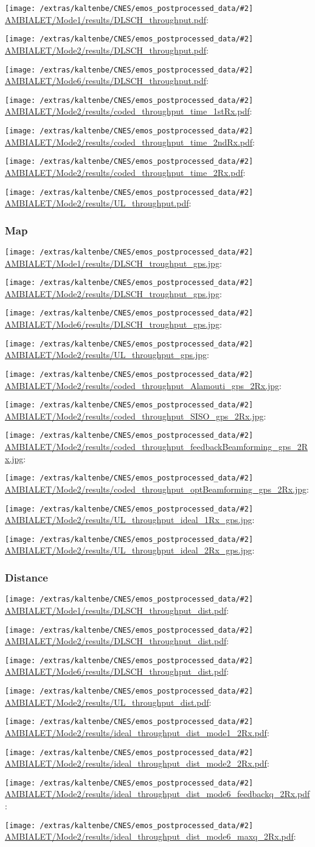 \documentclass[a4paper,10pt]{article}
\newcommand{\printfile}[2][]{
 \begin{minipage}{8cm}
  \centering
  \texttt{[image: /extras/kaltenbe/CNES/emos\_postprocessed\_data/\#2]}
  \url{#2}: #1

 \end{minipage}
}
\begin{document}
\printfile{AMBIALET/Mode1/results/DLSCH_throughput.pdf}
\printfile{AMBIALET/Mode2/results/DLSCH_throughput.pdf}

\printfile{AMBIALET/Mode6/results/DLSCH_throughput.pdf}
\printfile{AMBIALET/Mode2/results/coded_throughput_time_1stRx.pdf}

\printfile{AMBIALET/Mode2/results/coded_throughput_time_2ndRx.pdf}
\printfile{AMBIALET/Mode2/results/coded_throughput_time_2Rx.pdf}

\printfile{AMBIALET/Mode2/results/UL_throughput.pdf}


\subsubsection{Map}

\printfile{AMBIALET/Mode1/results/DLSCH_troughput_gps.jpg}
\printfile{AMBIALET/Mode2/results/DLSCH_troughput_gps.jpg}

\printfile{AMBIALET/Mode6/results/DLSCH_troughput_gps.jpg}
\printfile{AMBIALET/Mode2/results/UL_throughput_gps.jpg}

\printfile{AMBIALET/Mode2/results/coded_throughput_Alamouti_gps_2Rx.jpg}
\printfile{AMBIALET/Mode2/results/coded_throughput_SISO_gps_2Rx.jpg}

\printfile{AMBIALET/Mode2/results/coded_throughput_feedbackBeamforming_gps_2Rx.jpg}
\printfile{AMBIALET/Mode2/results/coded_throughput_optBeamforming_gps_2Rx.jpg}

\printfile{AMBIALET/Mode2/results/UL_throughput_ideal_1Rx_gps.jpg}
\printfile{AMBIALET/Mode2/results/UL_throughput_ideal_2Rx_gps.jpg}

\subsubsection{Distance}

\printfile{AMBIALET/Mode1/results/DLSCH_throughput_dist.pdf}
\printfile{AMBIALET/Mode2/results/DLSCH_throughput_dist.pdf}

\printfile{AMBIALET/Mode6/results/DLSCH_throughput_dist.pdf}
\printfile{AMBIALET/Mode2/results/UL_throughput_dist.pdf}

\printfile{AMBIALET/Mode2/results/ideal_throughput_dist_mode1_2Rx.pdf}
\printfile{AMBIALET/Mode2/results/ideal_throughput_dist_mode2_2Rx.pdf}

\printfile{AMBIALET/Mode2/results/ideal_throughput_dist_mode6_feedbackq_2Rx.pdf}
\printfile{AMBIALET/Mode2/results/ideal_throughput_dist_mode6_maxq_2Rx.pdf}
\end{document}
